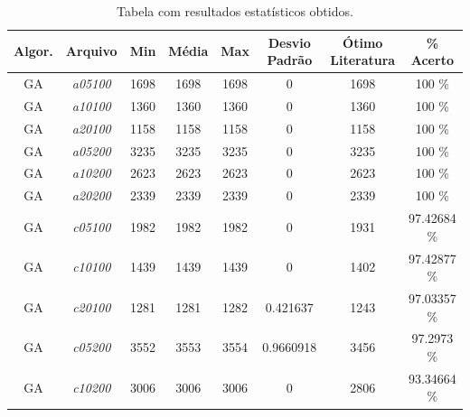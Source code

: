 \documentclass[portugues, brazil, a4paper,12pt]{article}
\begin{document}
	{ \scriptsize
		\begin{longtable}{cc|cccc|cc}
			\caption{Tabela com resultados estatísticos obtidos.} \label{tab:minavgmax} \\
			\hline
			\textbf{Algor.} & \textbf{Arquivo} & \textbf{Min} & \textbf{Média} & \textbf{Max} & \textbf{Desvio Padrão} & \textbf{Ótimo Literatura} & \textbf{\% Acerto} \\ \hline \hline
			GA                 & \textit{a05100}  & 1698      & 1698           & 1698         & 0                      & 1698                            & 100 \% \\
			GA                 & \textit{a10100}  & 1360      & 1360           & 1360         & 0                      & 1360                            & 100 \% \\
			GA                 & \textit{a20100}  & 1158      & 1158           & 1158         & 0                      & 1158                            & 100 \% \\
			GA                 & \textit{a05200}  & 3235      & 3235           & 3235         & 0                      & 3235                            & 100 \% \\
			GA                 & \textit{a10200}  & 2623      & 2623           & 2623         & 0                      & 2623                            & 100 \% \\
			GA                 & \textit{a20200}  & 2339      & 2339           & 2339         & 0                      & 2339                            & 100 \% \\
			GA                 & \textit{c05100}  & 1982      & 1982           & 1982         & 0                      &  1931                           & 97.42684 \% \\
			GA                 & \textit{c10100}  & 1439      & 1439           & 1439         & 0                      &  1402                           & 97.42877 \% \\
			GA                 & \textit{c20100}  & 1281      & 1281           & 1282         & 0.421637               &  1243                           & 97.03357 \% \\
			GA                 & \textit{c05200}  & 3552      & 3553           & 3554         & 0.9660918              &  3456                           & 97.2973 \% \\
			GA                 & \textit{c10200}  & 3006      & 3006           & 3006         & 0                      &  2806                           & 93.34664 \% \\

\end{longtable}}
\end{document}
